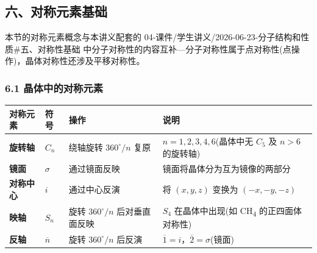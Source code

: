 \subsection{六、对称元素基础}\label{ux516dux5bf9ux79f0ux5143ux7d20ux57faux7840}

本节的对称元素概念与本讲义配套的 04-课件/学生讲义/2026-06-23-分子结构和性质\#五、对称性基础 中分子对称性的内容互补---分子对称性属于点对称性(点操作)，晶体对称性还涉及平移对称性。

\subsubsection{6.1 晶体中的对称元素}\label{ux6676ux4f53ux4e2dux7684ux5bf9ux79f0ux5143ux7d20}

{\def\LTcaptype{none} %
\begin{longtable}[]{@{}
  >{\centering\arraybackslash}p{}
  >{\centering\arraybackslash}p{}
  >{\raggedright\arraybackslash}p{}
  >{\raggedright\arraybackslash}p{}@{}}
\toprule\noalign{}
\begin{minipage}[b]{\linewidth}\centering
对称元素
\end{minipage} & \begin{minipage}[b]{\linewidth}\centering
符号
\end{minipage} & \begin{minipage}[b]{\linewidth}\raggedright
操作
\end{minipage} & \begin{minipage}[b]{\linewidth}\raggedright
说明
\end{minipage} \\
\midrule\noalign{}
\endhead
\bottomrule\noalign{}
\endlastfoot
\textbf{旋转轴} & \(C_n\) & 绕轴旋转 \(360^\circ/n\) 复原 & \(n = 1, 2, 3, 4, 6\)(晶体中无 \(C_5\) 及 \(n > 6\) 的旋转轴) \\
\textbf{镜面} & \(\sigma\) & 通过镜面反映 & 镜面将晶体分为互为镜像的两部分 \\
\textbf{对称中心} & \(i\) & 通过中心反演 & 将 \((x, y, z)\) 变换为 \((-x, -y, -z)\) \\
\textbf{映轴} & \(S_n\) & 旋转 \(360^\circ/n\) 后对垂直面反映 & \(S_4\) 在晶体中出现(如 CH\textsubscript{4} 的正四面体对称性) \\
\textbf{反轴} & \(\overline{n}\) & 旋转 \(360^\circ/n\) 后反演 & \(\overline{1} = i\)，\(\overline{2} = \sigma\)(镜面) \\
\end{longtable}
}

